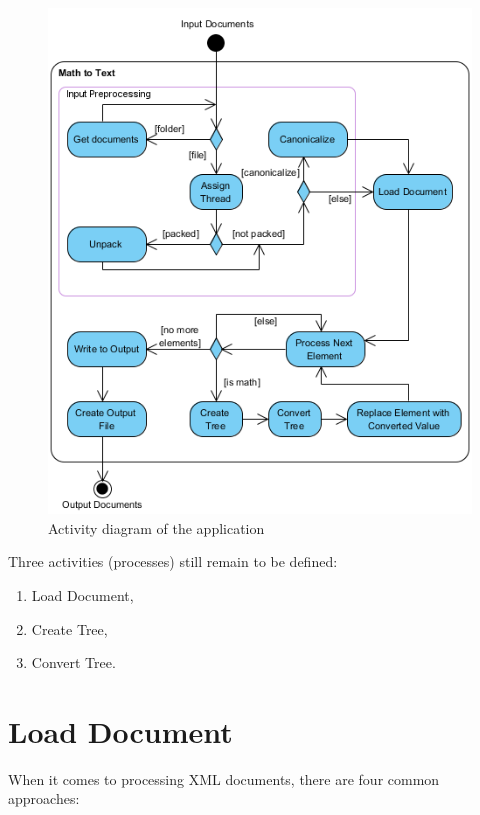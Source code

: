 \documentclass[11pt,oneside,final]{fithesis2}
\begin{document}
\begin{figure}[!ht]
\centering
\includegraphics[width=\textwidth]{activity_diagram_all}
\caption{Activity diagram of the application}
\label{fig:activitydiagramall}
\end{figure}
\newpage
Three activities (processes) still remain to be defined:
\begin{enumerate}
\item Load Document,
\item Create Tree,
\item Convert Tree.
\end{enumerate}

\section{Load Document}
\label{section:loaddocument}
When it comes to processing XML documents, there are four common approaches:
\end{document}
